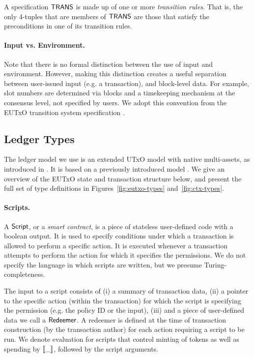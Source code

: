 A specification $\mathsf{TRANS}$ is made up of one or more
\emph{transition rules}. That is, the only 4-tuples that are members of $\mathsf{TRANS}$ are those that
satisfy the preconditions in one of its transition rules.

\paragraph{Input vs. Environment. }

Note that there is no formal distinction between the use of input and environment.
However, making this distinction creates a useful separation between user-issued
input (e.g. a transaction), and block-level data. For example, slot numbers are
determined via blocks and a timekeeping mechanism at the consensus level,
not specified by users. We adopt this convention from the
EUTxO transition system specification \cite{alonzo}.


\subsection{Ledger Types}

The ledger model we use is an extended UTxO model with native multi-assets,
as introduced in \cite{structured}. It is based on
a previously introduced model
\cite{eutxoma}. We give an overview of the EUTxO state and transaction structure
below, and present the full set of type definitions
in Figures~\ref{fig:eutxo-types} and~\ref{fig:ctx-types}.

\paragraph{Scripts. } A $\textsf{Script}$, or a \emph{smart contract},
is a piece of stateless user-defined code with a
boolean output. It is used to specify conditions under which a transaction is allowed
to perform a specific action. It is executed
whenever a transaction attempts to perform the action for which it specifies the
permissions. We do not specify the language in which scripts are written,
but we presume Turing-completeness.

The input to a script consists of (i) a summary of transaction data,
(ii) a pointer to the specific action (within the transaction) for which the script
is specifying the permission (e.g. the policy ID or the input),
(iii) and a piece of user-defined data we call a $\mathsf{Redeemer}$. A redeemer is defined
at the time of transaction construction (by the transaction author) for each action
requiring a script to be
run. We denote evaluation for scripts that control
minting of tokens as well as spending by $\llbracket\_\rrbracket$, followed by the
script arguments.

